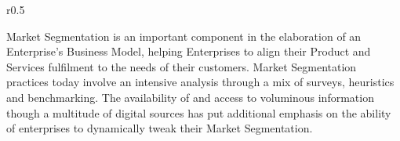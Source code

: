 %
%

\begin{wrapfigure}[12]{r}{0.5\textwidth}
    \vspace{-12pt}
    \begin{center}
        \begin{tcolorbox}[colback=secondary!5,colframe=secondary!60,left=2pt,right=2pt]
        \end{tcolorbox}
    \end{center}
\end{wrapfigure}

Market Segmentation is an important component in the elaboration of an Enterprise’s Business Model,
helping Enterprises to align their Product and Services fulfilment to the needs of their customers.
Market Segmentation practices today involve an intensive analysis through a mix of surveys,
heuristics and benchmarking.
The availability of and access to voluminous information though a multitude of digital sources has put
additional emphasis on the ability of enterprises to dynamically tweak their Market Segmentation.


